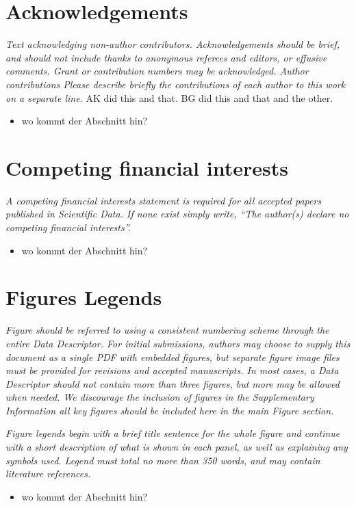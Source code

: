 \documentclass[english]{article}
\begin{document}
\section*{Acknowledgements}

\emph{Text acknowledging non-author contributors. Acknowledgements should
be brief, and should not include thanks to anonymous referees and
editors, or effusive comments. Grant or contribution numbers may be
acknowledged. Author contributions Please describe briefly the contributions
of each author to this work on a separate line.}
AK did this and that.
BG did this and that and the other.
\begin{itemize}
\item wo kommt der Abschnitt hin?
\end{itemize}

\section*{Competing financial interests}

\emph{A competing financial interests statement is required for all accepted
papers published in \emph{Scientific Data}. If none exist simply write,
``The author(s) declare no competing financial interests''.}
\begin{itemize}
\item wo kommt der Abschnitt hin?
\end{itemize}

\section*{Figures Legends}

\emph{Figure should be referred to using a consistent numbering scheme through
the entire Data Descriptor. For initial submissions, authors may choose
to supply this document as a single PDF with embedded figures, but
separate figure image files must be provided for revisions and accepted
manuscripts. In most cases, a Data Descriptor should not contain more
than three figures, but more may be allowed when needed. We discourage
the inclusion of figures in the Supplementary Information \textendash{}
all key figures should be included here in the main Figure section.}

\emph{Figure legends begin with a brief title sentence for the whole figure
and continue with a short description of what is shown in each panel,
as well as explaining any symbols used. Legend must total no more
than 350 words, and may contain literature references.}
\begin{itemize}
\item wo kommt der Abschnitt hin?
\end{itemize}
\end{document}
